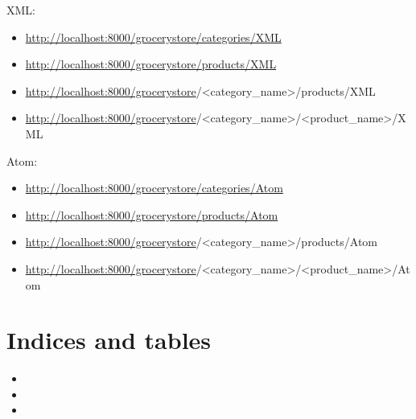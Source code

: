 \documentclass[letterpaper,10pt,english]{sphinxmanual}
\begin{document}
XML:
\begin{itemize}
\item {} 
\href{http://localhost:8000/grocerystore/categories/XML}{http://localhost:8000/grocerystore/categories/XML}

\item {} 
\href{http://localhost:8000/grocerystore/products/XML}{http://localhost:8000/grocerystore/products/XML}

\item {} 
\href{http://localhost:8000/grocerystore}{http://localhost:8000/grocerystore}/\textless{}category\_name\textgreater{}/products/XML

\item {} 
\href{http://localhost:8000/grocerystore}{http://localhost:8000/grocerystore}/\textless{}category\_name\textgreater{}/\textless{}product\_name\textgreater{}/XML

\end{itemize}

Atom:
\begin{itemize}
\item {} 
\href{http://localhost:8000/grocerystore/categories/Atom}{http://localhost:8000/grocerystore/categories/Atom}

\item {} 
\href{http://localhost:8000/grocerystore/products/Atom}{http://localhost:8000/grocerystore/products/Atom}

\item {} 
\href{http://localhost:8000/grocerystore}{http://localhost:8000/grocerystore}/\textless{}category\_name\textgreater{}/products/Atom

\item {} 
\href{http://localhost:8000/grocerystore}{http://localhost:8000/grocerystore}/\textless{}category\_name\textgreater{}/\textless{}product\_name\textgreater{}/Atom

\end{itemize}


\chapter{Indices and tables}
\label{index:indices-and-tables}\begin{itemize}
\item {} 

\item {} 

\item {} 

\end{itemize}
\end{document}
